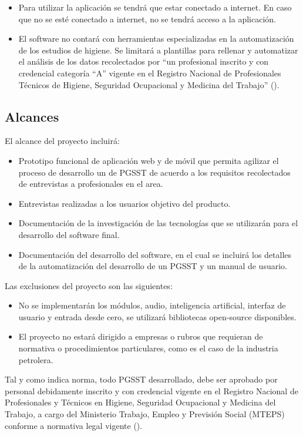 \begin{itemize}
	\item Para utilizar la aplicación se tendrá que estar conectado a internet. En
	caso que no se esté conectado a internet, no se tendrá acceso a la
	aplicación.
	\item El software no contará con herramientas especializadas en la automatización de los estudios de higiene. Se limitará a plantillas para rellenar y automatizar el análisis de los datos recolectados por ``un profesional inscrito y con credencial categoría ``A'' vigente en el Registro Nacional de Profesionales Técnicos de Higiene, Seguridad Ocupacional y Medicina del Trabajo'' (\cite{NTS-009/23}).
\end{itemize}

\subsection{Alcances}

\noindent
El alcance del proyecto incluirá:

\begin{itemize}
	\item Prototipo funcional de aplicación web y de móvil que permita agilizar el proceso de desarrollo un de PGSST de acuerdo a los requisitos recolectados de entrevistas a profesionales en el area.
	\item Entrevistas realizadas a los usuarios objetivo del producto.
	\item Documentación de la investigación de las tecnologías que se utilizarán para el
	desarrollo del software final.
	\item Documentación del desarrollo del software, en el cual se incluirá los detalles de la automatización del desarrollo de un PGSST y un manual de usuario.
\end{itemize}

\noindent
Las exclusiones del proyecto son las siguientes:
\begin{itemize}
	\item No se implementarán los módulos, audio, inteligencia artificial, interfaz de usuario y entrada desde cero, se utilizará bibliotecas open-source disponibles.
	\item El proyecto no estará dirigido a empresas o rubros que requieran de normativa o procedimientos particulares, como es el caso de la industria petrolera.
\end{itemize}

Tal y como indica norma, todo PGSST desarrollado, debe ser aprobado por personal debidamente inscrito y con credencial vigente en el Registro Nacional de Profesionales y Técnicos en Higiene, Seguridad Ocupacional y Medicina del Trabajo, a cargo del Ministerio Trabajo, Empleo y Previsión Social (MTEPS) conforme a normativa legal vigente (\cite{NTS-009/23}).
